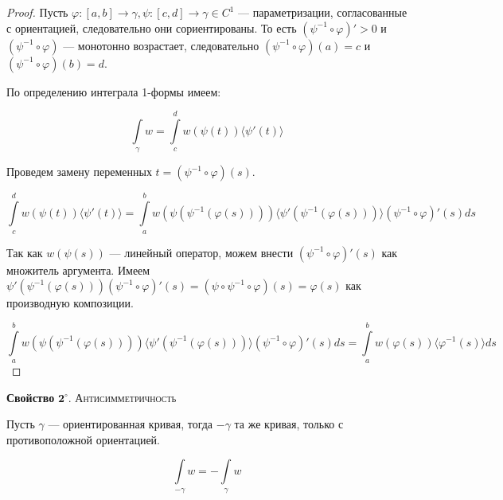 \documentclass[a5paper]{article}
\theoremstyle{plain}
\theoremstyle{definition}
\numberwithin{through}{section}
\numberwithin{equation}{section}
\begin{document}
	\begin{proof}
		Пусть $\varphi : [a, b] \to \gamma, \psi : [c, d] \to \gamma \in C^1$ --- параметризации, согласованные с ориентацией, следовательно они сориентированы. То есть  $(\psi^{-1} \circ \varphi)' > 0$ и $(\psi^{-1} \circ \varphi)$ --- монотонно возрастает, следовательно $(\psi^{-1} \circ \varphi)(a) = c$ и $(\psi^{-1} \circ \varphi)(b) = d$.
		
		По определению интеграла 1-формы имеем:
		
		\begin{equation*}
			\int\limits_{\gamma} w = \int\limits_{c}^{d} w(\psi(t)) \langle \psi'(t) \rangle 
		\end{equation*}
		
		Проведем замену переменных $t = (\psi^{-1} \circ \varphi)(s)$.
		
		\begin{equation*}
			\int\limits_{c}^{d} w(\psi(t)) \langle \psi'(t) \rangle = \int\limits_{a}^{b} w(\psi(\psi^{-1}(\varphi(s)))) \langle \psi'(\psi^{-1}(\varphi(s))) \rangle (\psi^{-1} \circ \varphi)'(s) ds
		\end{equation*}
		
		Так как $w(\psi(s))$ --- линейный оператор, можем внести $(\psi^{-1} \circ \varphi)'(s)$ как множитель аргумента. Имеем $\psi'(\psi^{-1}(\varphi(s)))(\psi^{-1} \circ \varphi)'(s) = (\psi \circ \psi^{-1} \circ \varphi)(s)= \varphi(s)$ как производную композиции.
		
		\begin{equation*}
			 \int\limits_{a}^{b} w(\psi(\psi^{-1}(\varphi(s)))) \langle \psi'(\psi^{-1}(\varphi(s))) \rangle (\psi^{-1} \circ \varphi)'(s) ds = \int\limits_{a}^{b} w(\varphi(s)) \langle \varphi^{-1}(s) \rangle ds
		\end{equation*} 
	\end{proof}

	{\bf Свойство} $\mathbf{2^\circ.}$
	{\textsc{Антисимметричность}}
	
	Пусть $\gamma$ --- ориентированная кривая, тогда $-\gamma$ та же кривая, только с противоположной ориентацией. 
	
	\begin{equation*}
		\int\limits_{-\gamma} w = -\int\limits_{\gamma} w
	\end{equation*}
	
\end{document}
